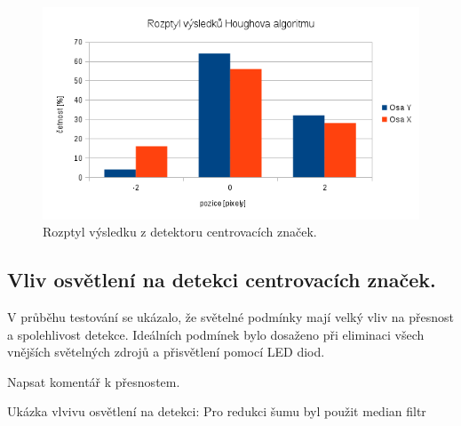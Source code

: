 \begin{figure}[h!]
  \centering
    \includegraphics[width=0.9\linewidth]{obrazky/houghGraph.png}%
    \caption{Rozptyl výsledku z detektoru centrovacích značek.}
    \label{fig:billateralfilter}
\end{figure}



\subsection{Vliv osvětlení na detekci centrovacích značek.}
V průběhu testování se ukázalo, že světelné podmínky mají velký vliv na přesnost a spolehlivost detekce. Ideálních podmínek bylo dosaženo při eliminaci všech vnějších světelných zdrojů a přisvětlení pomocí LED diod.

Napsat komentář k přesnostem.

Ukázka vlvivu osvětlení na detekci: Pro redukci šumu byl použit median filtr



